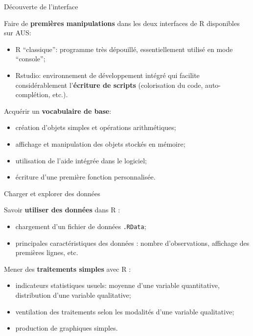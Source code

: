 \documentclass[12pt,ignorenonframetext,]{beamer}
\providecommand{\tightlist}{%
  \setlength{\itemsep}{0pt}\setlength{\parskip}{0pt}}
\begin{document}
\begin{frame}{Découverte de l’interface}
\protect\hypertarget{decouverte-de-linterface}{}

Faire de \textbf{premières manipulations} dans les deux interfaces de R
disponibles sur AUS:

\begin{itemize}
\item
  R \enquote{classique}: programme très dépouillé, essentiellement
  utilisé en mode \enquote{console};
\item
  Rstudio: environnement de développement intégré qui facilite
  considérablement l’\textbf{écriture de scripts} (colorisation du code,
  auto-complétion, etc.).
\end{itemize}

\bigskip \pause Acquérir un \textbf{vocabulaire de base}:

\begin{itemize}
\tightlist
\item
  création d’objets simples et opérations arithmétiques;
\item
  affichage et manipulation des objets stockés en mémoire;
\item
  utilisation de l’aide intégrée dans le logiciel;
\item
  écriture d’une première fonction personnalisée.
\end{itemize}

\end{frame}

\begin{frame}[fragile]{Charger et explorer des données}
\protect\hypertarget{charger-et-explorer-des-donnees}{}

Savoir \textbf{utiliser des données} dans R :

\begin{itemize}
\tightlist
\item
  chargement d’un fichier de données \texttt{.RData};
\item
  principales caractéristiques des données : nombre d’observations,
  affichage des premières lignes, etc.
\end{itemize}

\bigskip \pause Mener des \textbf{traitements simples} avec R :

\begin{itemize}
\tightlist
\item
  indicateurs statistiques usuels: moyenne d’une variable quantitative,
  distribution d’une variable qualitative;
\item
  ventilation des traitements selon les modalités d’une variable
  qualitative;
\item
  production de graphiques simples.
\end{itemize}

\end{frame}
\end{document}
